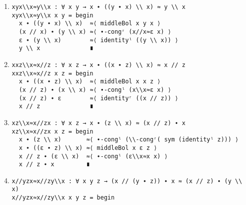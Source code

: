 \begin{enumerate}
\item
\begin{verbatim}
xyx\\x≈y\\x : ∀ x y → x ∙ ((y ∙ x) \\ x) ≈ y \\ x
xyx\\x≈y\\x x y = begin
  x ∙ ((y ∙ x) \\ x)  ≈⟨ middleBol x y x ⟩
  (x // x) ∙ (y \\ x) ≈⟨ ∙-congʳ (x//x≈ε x) ⟩
  ε ∙ (y \\ x)        ≈⟨ identityˡ ((y \\ x)) ⟩
  y \\ x              ∎
\end{verbatim}
\item
\begin{verbatim}
xxz\\x≈x//z : ∀ x z → x ∙ ((x ∙ z) \\ x) ≈ x // z
xxz\\x≈x//z x z = begin
  x ∙ ((x ∙ z) \\ x)  ≈⟨ middleBol x x z ⟩
  (x // z) ∙ (x \\ x) ≈⟨ ∙-congˡ (x\\x≈ε x) ⟩
  (x // z) ∙ ε        ≈⟨ identityʳ ((x // z)) ⟩
  x // z              ∎
\end{verbatim}
\item
\begin{verbatim}
xz\\x≈x//zx : ∀ x z → x ∙ (z \\ x) ≈ (x // z) ∙ x
xz\\x≈x//zx x z = begin
  x ∙ (z \\ x)       ≈⟨ ∙-congˡ (\\-congʳ( sym (identityˡ z))) ⟩
  x ∙ ((ε ∙ z) \\ x) ≈⟨ middleBol x ε z ⟩
  x // z ∙ (ε \\ x)  ≈⟨ ∙-congˡ (ε\\x≈x x) ⟩
  x // z ∙ x         ∎
\end{verbatim}
\item
\begin{verbatim}
x//yzx≈x//zy\\x : ∀ x y z → (x // (y ∙ z)) ∙ x ≈ (x // z) ∙ (y \\ x)
x//yzx≈x//zy\\x x y z = begin

\end{verbatim}
\end{enumerate}
